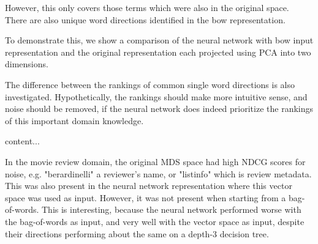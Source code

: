 However, this only covers those terms which were also in the original space. There are also unique word directions identified in the bow representation. %


To demonstrate this, we show a comparison of the neural network with bow input representation and the original representation each projected using PCA into two dimensions.


The difference between the rankings of common single word directions is also investigated. Hypothetically, the rankings should make more intuitive sense, and noise should be removed, if the neural network does indeed prioritize the rankings of this important domain knowledge.






\begin{table}[]\label{For movies Top directions +}
	content...
\end{table}
 
In the movie review domain, the original MDS space had high NDCG scores for noise, e.g. "berardinelli" a reviewer's name, or "listinfo" which is review metadata. This was also present in the neural network representation where this vector space was used as input. However, it was not present when starting from a bag-of-words. This is interesting, because the neural network performed worse with the bag-of-words as input, and very well with the vector space as input, despite their directions performing about the same on a depth-3 decision tree.

